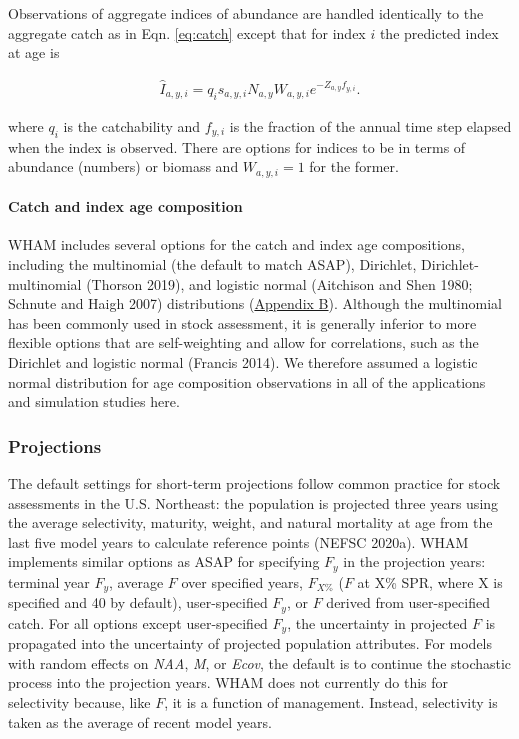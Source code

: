 \documentclass[]{article}
\let\oldparagraph\paragraph
\renewcommand{\paragraph}[1]{\oldparagraph{#1}\mbox{}}
\begin{document}
Observations of aggregate indices of abundance are handled identically
to the aggregate catch as in Eqn. \ref{eq:catch} except that for index
\(i\) the predicted index at age is

\begin{equation}
\label{eq:predindex}
  \begin{array}{c}
    \hat{I}_{a,y,i} = q_i s_{a,y,i} N_{a,y}W_{a,y,i} e^{-Z_{a,y}f_{y,i}}.
  \end{array}
\end{equation}

where \(q_i\) is the catchability and \(f_{y,i}\) is the fraction of the
annual time step elapsed when the index is observed. There are options
for indices to be in terms of abundance (numbers) or biomass and
\(W_{a,y,i} = 1\) for the former.

\hypertarget{catch-and-index-age-composition}{%
\paragraph{Catch and index age
composition}\label{catch-and-index-age-composition}}

WHAM includes several options for the catch and index age compositions,
including the multinomial (the default to match ASAP), Dirichlet,
Dirichlet-multinomial (Thorson 2019), and logistic normal (Aitchison and
Shen 1980; Schnute and Haigh 2007) distributions
(\protect\hyperlink{appendix-b}{Appendix B}). Although the multinomial
has been commonly used in stock assessment, it is generally inferior to
more flexible options that are self-weighting and allow for
correlations, such as the Dirichlet and logistic normal (Francis 2014).
We therefore assumed a logistic normal distribution for age composition
observations in all of the applications and simulation studies here.

\hypertarget{projections}{%
\subsubsection{Projections}\label{projections}}

The default settings for short-term projections follow common practice
for stock assessments in the U.S. Northeast: the population is projected
three years using the average selectivity, maturity, weight, and natural
mortality at age from the last five model years to calculate reference
points (NEFSC 2020a). WHAM implements similar options as ASAP for
specifying \(F_y\) in the projection years: terminal year \(F_y\),
average \(F\) over specified years, \(F_{X\%}\) (\(F\) at X\% SPR, where
X is specified and 40 by default), user-specified \(F_y\), or \(F\)
derived from user-specified catch. For all options except user-specified
\(F_y\), the uncertainty in projected \(F\) is propagated into the
uncertainty of projected population attributes. For models with random
effects on \emph{NAA}, \emph{M}, or \emph{Ecov}, the default is to
continue the stochastic process into the projection years. WHAM does not
currently do this for selectivity because, like \(F\), it is a function
of management. Instead, selectivity is taken as the average of recent
model years.
\end{document}
